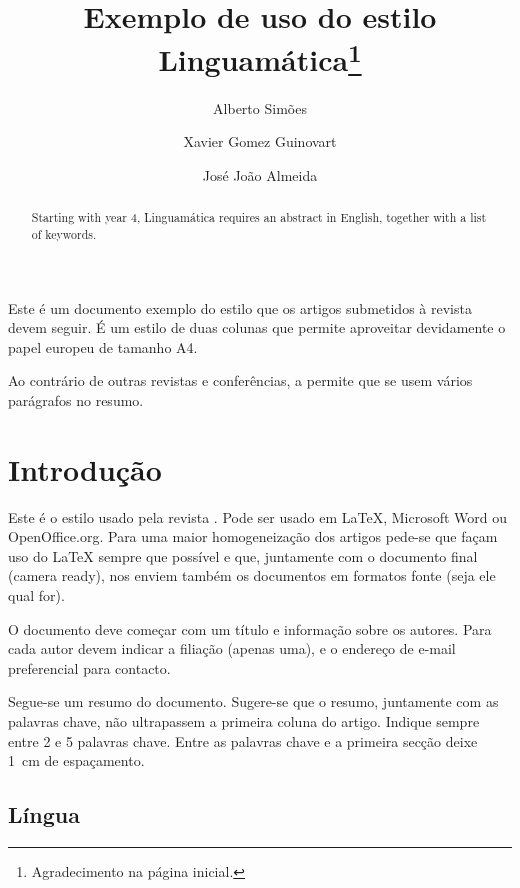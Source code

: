 \documentclass[a4paper, twocolumn, 11pt, twoside]{article}
\title{Exemplo de uso do estilo Linguamática\thanks{Agradecimento na página inicial.}}
\author{
  Alberto Simões
  \instituto{Universidade do Minho}
  \email{ambs@ilch.uminho.pt} 
  \and 
  Xavier Gomez Guinovart
  \instituto{Universidade de Vigo}
  \email{xgg@uvigo.es}
  \and 
  José João Almeida
  \instituto{Universidade do Minho}
  \email{jj@di.uminho.pt}
}
\date{}
\begin{document}
\maketitle

\begin{resumo}
  Este é um documento exemplo do estilo que os artigos submetidos à
  revista \linguamatica{} devem seguir. É um estilo de duas colunas
  que permite aproveitar devidamente o papel europeu de tamanho A4.

  Ao contrário de outras revistas e conferências, a \linguamatica{}
  permite que se usem vários parágrafos no resumo.
\end{resumo}


\begin{abstract}
  Starting with year 4, Linguamática requires an abstract in English, together with
  a list of keywords.
\end{abstract}


\section{Introdução}

Este é o estilo usado pela revista \linguamatica. Pode ser usado em
\LaTeX \cite{latexcompanion}, Microsoft Word ou OpenOffice.org. Para
uma maior homogeneização dos artigos pede-se que façam uso do \LaTeX{}
sempre que possível e que, juntamente com o documento final (camera
ready), nos enviem também os documentos em formatos fonte (seja ele
qual for).

O documento deve começar com um título e informação sobre os
autores. Para cada autor devem indicar a filiação (apenas uma), e o
endereço de e-mail preferencial para contacto.

Segue-se um resumo do documento. Sugere-se que o resumo, juntamente
com as palavras chave, não ultrapassem a primeira coluna do
artigo. Indique sempre entre 2 e 5 palavras chave. Entre as palavras
chave e a primeira secção deixe 1~cm de espaçamento.

\subsection{Língua}
\end{document}
